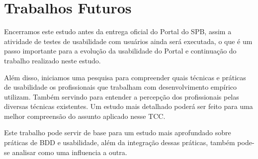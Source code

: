 \section{Trabalhos Futuros}

Encerramos este estudo antes da entrega oficial do Portal do SPB, assim a atividade de testes de usabilidade com usuários ainda será executada, o que é um passo importante para a evolução da usabilidade do Portal e continuação do trabalho realizado neste estudo.

Além disso, iniciamos uma pesquisa para compreender quais técnicas e práticas de usabilidade os profissionais que trabalham com desenvolvimento empírico utilizam. Também servindo para entender a percepção dos profissionais pelas diversas técnicas existentes. Um estudo mais detalhado poderá ser feito para uma melhor compreensão do assunto aplicado nesse TCC. 

Este trabalho pode servir de base para um estudo mais aprofundado sobre práticas de BDD e usabilidade, além da integração dessas práticas, também pode-se analisar como uma influencia a outra.

